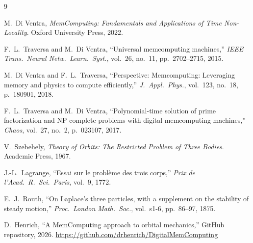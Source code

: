 \documentclass[aip,preprint,amsmath,amssymb,floatfix]{revtex4-2}
\begin{document}
\begin{thebibliography}{9}
\setlength{\itemsep}{2pt}

M.~Di Ventra, \textit{MemComputing: Fundamentals and Applications of Time
Non-Locality}. Oxford University Press, 2022.

F.~L.~Traversa and M.~Di Ventra, ``Universal memcomputing machines,''
\textit{IEEE Trans.\ Neural Netw.\ Learn.\ Syst.}, vol.~26, no.~11,
pp.~2702--2715, 2015.

M.~Di Ventra and F.~L.~Traversa, ``Perspective: Memcomputing: Leveraging memory
and physics to compute efficiently,'' \textit{J.~Appl.\ Phys.}, vol.~123,
no.~18, p.~180901, 2018.

F.~L.~Traversa and M.~Di Ventra, ``Polynomial-time solution of prime
factorization and NP-complete problems with digital memcomputing machines,''
\textit{Chaos}, vol.~27, no.~2, p.~023107, 2017.

V.~Szebehely, \textit{Theory of Orbits: The Restricted Problem of Three Bodies}.
Academic Press, 1967.

J.-L.~Lagrange, ``Essai sur le probl\`eme des trois corps,'' \textit{Prix de
l'Acad.\ R.\ Sci.\ Paris}, vol.~9, 1772.

E.~J.~Routh, ``On Laplace's three particles, with a supplement on the stability
of steady motion,'' \textit{Proc.\ London Math.\ Soc.}, vol.~s1-6, pp.~86--97,
1875.

D.~Henrich, ``A MemComputing approach to orbital mechanics,'' GitHub repository,
2026. \url{https://github.com/drhenrich/DigitalMemComputing}

\end{thebibliography}
\end{document}
